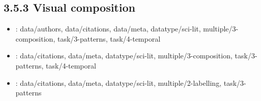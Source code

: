 \begin {refsection}
\section [3.5.3 Visual composition] {3.5.3 Visual composition}

\begin {itemize}
\item \cite {shen-2006-biblioviz:-a-system-for-visualizing-bibliography-information}:
    data/authors, data/citations, data/meta, datatype/sci-lit, multiple/3-composition, task/3-patterns, task/4-temporal


\item \cite {zhao-2013-interactive-exploration-of-implicit-and-explicit-relations}:
    data/citations, data/meta, datatype/sci-lit, multiple/3-composition, task/3-patterns, task/4-temporal


\item \cite {ham-2004-case-study:-visualizing-visualization}:
    data/citations, data/meta, datatype/sci-lit, multiple/2-labelling, task/3-patterns


\end {itemize}
\printbibliography
\end {refsection}\pagebreak

